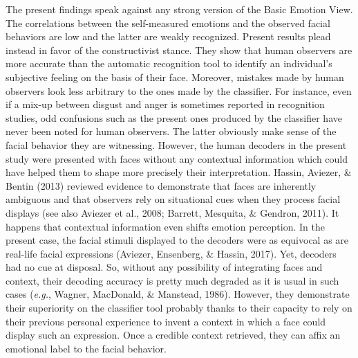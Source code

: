 \documentclass[man]{apa6}
\begin{document}
The present findings speak against any strong version of the Basic Emotion View. The correlations between the self-measured emotions and the observed facial behaviors are low and the latter are weakly recognized. Present results plead instead in favor of the constructivist stance. They show that human observers are more accurate than the automatic recognition tool to identify an individual's subjective feeling on the basis of their face. Moreover, mistakes made by human observers look less arbitrary to the ones made by the classifier. For instance, even if a mix-up between disgust and anger is sometimes reported in recognition studies, odd confusions such as the present ones produced by the classifier have never been noted for human observers. The latter obviously make sense of the facial behavior they are witnessing. However, the human decoders in the present study were presented with faces without any contextual information which could have helped them to shape more precisely their interpretation. Hassin, Aviezer, \& Bentin (2013) reviewed evidence to demonstrate that faces are inherently ambiguous and that observers rely on situational cues when they process facial displays (see also Aviezer et al., 2008; Barrett, Mesquita, \& Gendron, 2011). It happens that contextual information even shifts emotion perception. In the present case, the facial stimuli displayed to the decoders were as equivocal as are real-life facial expressions (Aviezer, Ensenberg, \& Hassin, 2017). Yet, decoders had no cue at disposal. So, without any possibility of integrating faces and context, their decoding accuracy is pretty much degraded as it is usual in such cases (\emph{e.g.}, Wagner, MacDonald, \& Manstead, 1986). However, they demonstrate their superiority on the classifier tool probably thanks to their capacity to rely on their previous personal experience to invent a context in which a face could display such an expression. Once a credible context retrieved, they can affix an emotional label to the facial behavior.
\end{document}
